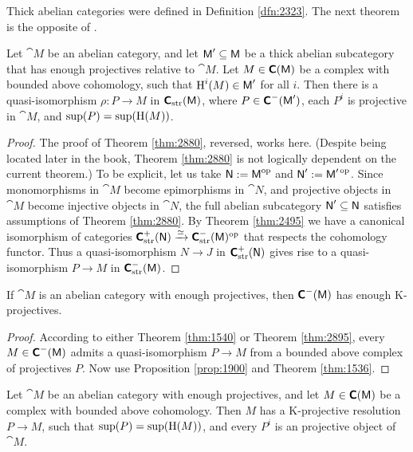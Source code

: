 Thick abelian categories were defined in Definition \ref {dfn:2323}.
The next theorem is the opposite of \cite[Lemma I.4.6(3)]{RD}. 

\begin{thm} \label{thm:2895}
Let $\cat{M}$ be an abelian category, and let $\operatorname{\mathsf{M}}' \subseteq \operatorname{\mathsf{M}}$ be a 
thick abelian subcategory that has enough projectives relative to $\cat{M}$. 
Let $M \in \boldsymbol{\mathsf{C}}(\operatorname{\mathsf{M}})$ be a complex with bounded above cohomology, 
such that $\operatorname{H}^i(M) \in \operatorname{\mathsf{M}}'$ for all $i$.
Then there is a quasi-isomorphism $\rho : P \to M$ in 
$\boldsymbol{\mathsf{C}}_{\mathrm{str}}(\operatorname{\mathsf{M}})$, where 
$P \in \boldsymbol{\mathsf{C}}^-(\operatorname{\mathsf{M}}')$, each $P^i$ is projective in $\cat{M}$,
and $\operatorname{sup}(P) = \operatorname{sup}(\operatorname{H}(M))$. 
\end{thm}

\begin{proof}
The proof of Theorem \ref{thm:2880}, reversed, works here. 
(Despite being located later in the book, Theorem \ref{thm:2880} is 
not logically dependent on the current theorem.)
To be explicit, let us take $\operatorname{\mathsf{N}} := \operatorname{\mathsf{M}}^{\mathrm{op}}$ and 
$\operatorname{\mathsf{N}}' := \operatorname{\mathsf{M}}'^{\, \mathrm{op}}$.
Since monomorphisms in $\cat{M}$ become epimorphisms in $\cat{N}$, 
and projective objects in $\cat{M}$ become injective objects in $\cat{N}$,
the full abelian subcategory $\operatorname{\mathsf{N}}' \subseteq \operatorname{\mathsf{N}}$ satisfies 
assumptions of Theorem \ref{thm:2880}. By Theorem \ref{thm:2495} we have a 
canonical isomorphism of categories 
$\operatorname{\boldsymbol{\mathsf{C}}}^{+}_{\mathrm{str}}(\operatorname{\mathsf{N}}) \xrightarrow{\simeq} 
\boldsymbol{\mathsf{C}}^-_{\mathrm{str}}(\operatorname{\mathsf{M}})^{\mathrm{op}}$
that respects the cohomology functor. 
Thus a quasi-isomorphism $N \to J$ in 
$\operatorname{\boldsymbol{\mathsf{C}}}^{+}_{\mathrm{str}}(\operatorname{\mathsf{N}})$
gives rise to a quasi-isomorphism $P \to M$ in 
$\operatorname{\boldsymbol{\mathsf{C}}}^{-}_{\mathrm{str}}(\operatorname{\mathsf{M}})$.
\end{proof}

\begin{cor} \label{cor:1900}
If $\cat{M}$ is an abelian category with enough projectives, then  
$\operatorname{\boldsymbol{\mathsf{C}}}^{-}(\operatorname{\mathsf{M}})$ has enough K-projectives. 
\end{cor}

\begin{proof}
According to either Theorem \ref{thm:1540} or Theorem \ref{thm:2895},
every $M \in \operatorname{\boldsymbol{\mathsf{C}}}^{-}(\operatorname{\mathsf{M}})$ admits a quasi-isomorphism $P \to M$
from a bounded above complex of projectives $P$. Now use Proposition 
\ref{prop:1900} and Theorem \ref{thm:1536}. 
\end{proof}

\begin{cor} \label{cor:1750}
Let $\cat{M}$ be an abelian category with enough projectives, 
and let $M \in \boldsymbol{\mathsf{C}}(\operatorname{\mathsf{M}})$ be a complex with bounded above cohomology. 
Then $M$ has a K-projective resolution $P \to M$,
such that $\operatorname{sup}(P) = \operatorname{sup}(\operatorname{H}(M))$,
and every $P^i$ is an projective object of $\cat{M}$. 
\end{cor}

